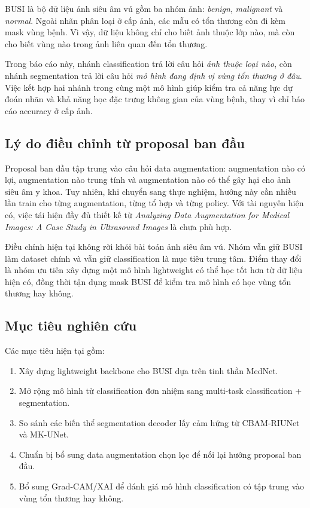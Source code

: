 \documentclass[12pt,a4paper]{article}
\begin{document}
BUSI là bộ dữ liệu ảnh siêu âm vú gồm ba nhóm ảnh: \textit{benign}, \textit{malignant} và \textit{normal}. Ngoài nhãn phân loại ở cấp ảnh, các mẫu có tổn thương còn đi kèm mask vùng bệnh. Vì vậy, dữ liệu không chỉ cho biết ảnh thuộc lớp nào, mà còn cho biết vùng nào trong ảnh liên quan đến tổn thương.

Trong báo cáo này, nhánh classification trả lời câu hỏi \textit{ảnh thuộc loại nào}, còn nhánh segmentation trả lời câu hỏi \textit{mô hình đang định vị vùng tổn thương ở đâu}. Việc kết hợp hai nhánh trong cùng một mô hình giúp kiểm tra cả năng lực dự đoán nhãn và khả năng học đặc trưng không gian của vùng bệnh, thay vì chỉ báo cáo accuracy ở cấp ảnh.

\subsection{Lý do điều chỉnh từ proposal ban đầu}

Proposal ban đầu tập trung vào câu hỏi data augmentation: augmentation nào có lợi, augmentation nào trung tính và augmentation nào có thể gây hại cho ảnh siêu âm y khoa. Tuy nhiên, khi chuyển sang thực nghiệm, hướng này cần nhiều lần train cho từng augmentation, từng tổ hợp và từng policy. Với tài nguyên hiện có, việc tái hiện đầy đủ thiết kế từ \textit{Analyzing Data Augmentation for Medical Images: A Case Study in Ultrasound Images} là chưa phù hợp.

Điều chỉnh hiện tại không rời khỏi bài toán ảnh siêu âm vú. Nhóm vẫn giữ BUSI làm dataset chính và vẫn giữ classification là mục tiêu trung tâm. Điểm thay đổi là nhóm ưu tiên xây dựng một mô hình lightweight có thể học tốt hơn từ dữ liệu hiện có, đồng thời tận dụng mask BUSI để kiểm tra mô hình có học vùng tổn thương hay không.

\subsection{Mục tiêu nghiên cứu}

Các mục tiêu hiện tại gồm:

\begin{enumerate}
    \item Xây dựng lightweight backbone cho BUSI dựa trên tinh thần MedNet.
    \item Mở rộng mô hình từ classification đơn nhiệm sang multi-task classification + segmentation.
    \item So sánh các biến thể segmentation decoder lấy cảm hứng từ CBAM-RIUNet và MK-UNet.
    \item Chuẩn bị bổ sung data augmentation chọn lọc để nối lại hướng proposal ban đầu.
    \item Bổ sung Grad-CAM/XAI để đánh giá mô hình classification có tập trung vào vùng tổn thương hay không.
\end{enumerate}
\end{document}
